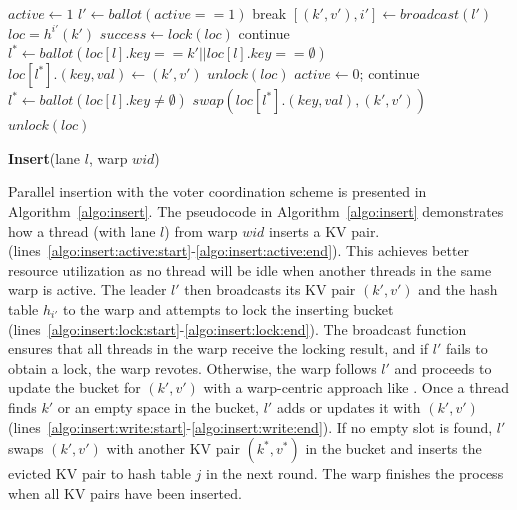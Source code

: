 \begin{algorithm}[t]
	\begin{algorithmic}[1]
		\State $active \gets 1$	\label{algo:insert:active:start}
		\State $l' \gets ballot(active == 1)$ \label{algo:insert:vote:start}
		\State break \label{algo:insert:active:end}
		\EndIf
		\State $[(k',v'),i'] \gets broadcast(l')$ \label{algo:insert:lock:start}
		\State $loc = h^{i'}(k')$
		\State $success \gets lock(loc)$ \label{algo:insert:lock:end}
		\EndIf
		\State continue					\label{algo:insert:vote:end}
		\EndIf
		\State $l^* \gets ballot(loc[l].key == k' || loc[l].key ==\emptyset)$ \label{algo:insert:write:start}
		\State $loc[l^*].(key,val) \gets (k',v')$
		\State $unlock(loc)$
		\State $active \gets 0$;
		\State continue			\label{algo:insert:write:end}
		\EndIf
		\State $l^* \gets ballot(loc[l].key \neq \emptyset)$
		\State $swap(loc[l^*].(key,val),(k',v'))$
		\State $unlock(loc)$ \label{algo:insert:loop:end}
		\EndIf
		\EndWhile
	\end{algorithmic}
	\caption{\textbf{Insert}(lane $l$, warp $wid$)}\label{algo:insert}
\end{algorithm}

Parallel insertion with the voter coordination scheme is presented in Algorithm~\ref{algo:insert}.
The pseudocode in Algorithm~\ref{algo:insert} demonstrates how a thread (with lane $l$) from warp $wid$ inserts a KV pair. 
 (lines~\ref{algo:insert:active:start}-\ref{algo:insert:active:end}).  
This achieves better resource utilization as no thread will be idle when another threads in the same warp is active.  
The leader $l'$ then broadcasts its KV pair $(k',v')$ and the hash table $h_{i'}$ to the warp and attempts to lock the inserting bucket (lines~\ref{algo:insert:lock:start}-\ref{algo:insert:lock:end}). 
The broadcast function ensures that all threads in the warp receive the locking result, and if $l'$ fails to obtain a lock, the warp revotes.
Otherwise, the warp follows $l'$ and proceeds to update the bucket for $(k',v')$ with a warp-centric approach like .
Once a thread finds $k'$ or an empty space in the bucket, $l'$ adds or updates it with $(k',v')$ (lines~\ref{algo:insert:write:start}-\ref{algo:insert:write:end}).
If no empty slot is found, $l'$ swaps $(k',v')$ with another KV pair $(k^*,v^*)$ in the bucket and inserts the evicted KV pair to hash table $j$ in the next round. 
The warp finishes the process when all KV pairs have been inserted.


